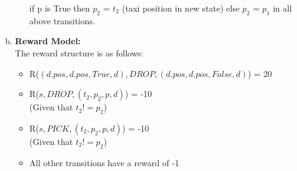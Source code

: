 \documentclass{article}
\begin{document}
\begin{enumerate}[a)]
\begin{itemize}
    if p is True then $p_2$ = $t_2$ (taxi position in new state) else $p_2$ = $p_1$  in all above transitions.

\end{itemize}


\item \textbf{Reward Model:\\}The reward structure is as follows:
\begin{itemize}
    \item R($(d.pos,d.pos,True,d),DROP,(d.pos,d.pos,False,d)$) = 20
    \item R($s,DROP,(t_2,p_2,p,d)$) = -10\\
        (Given that $t_2 != p_2$)
    \item R($s,PICK,(t_2,p_2,p,d)$) = -10\\
        (Given that $t_2 != p_2$)
    \item All other transitions have a reward of -1
\end{itemize}
\end{enumerate}
\end{document}
